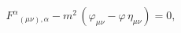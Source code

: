 \begin{equation}
F^{\alpha }{}_{(\mu \nu ),\alpha }
- m^{2}\,\left( \varphi_{\mu\nu}-\varphi\,\eta _{\mu \nu }\right) =0 ,
\label{mc1}
\end{equation}

